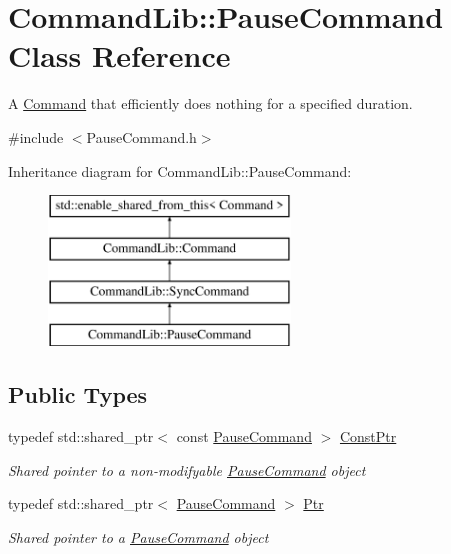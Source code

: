 \hypertarget{class_command_lib_1_1_pause_command}{}\section{Command\+Lib\+:\+:Pause\+Command Class Reference}
\label{class_command_lib_1_1_pause_command}


A \mbox{\hyperlink{class_command_lib_1_1_command}{Command}} that efficiently does nothing for a specified duration. 




{\ttfamily \#include $<$Pause\+Command.\+h$>$}

Inheritance diagram for Command\+Lib\+:\+:Pause\+Command\+:\begin{figure}[H]
\begin{center}
\leavevmode
\includegraphics[height=4.000000cm]{class_command_lib_1_1_pause_command}
\end{center}
\end{figure}
\subsection*{Public Types}
\begin{DoxyCompactItemize}
\item 
typedef std\+::shared\+\_\+ptr$<$ const \mbox{\hyperlink{class_command_lib_1_1_pause_command}{Pause\+Command}} $>$ \mbox{\hyperlink{class_command_lib_1_1_pause_command_ad14df8483794045a09d0b08007cbf289}{Const\+Ptr}}
\begin{DoxyCompactList}\small\item\em Shared pointer to a non-\/modifyable \mbox{\hyperlink{class_command_lib_1_1_pause_command}{Pause\+Command}} object\end{DoxyCompactList}\item 
typedef std\+::shared\+\_\+ptr$<$ \mbox{\hyperlink{class_command_lib_1_1_pause_command}{Pause\+Command}} $>$ \mbox{\hyperlink{class_command_lib_1_1_pause_command_ac4c00381b2c560c5d072a0eedaefa92b}{Ptr}}
\begin{DoxyCompactList}\small\item\em Shared pointer to a \mbox{\hyperlink{class_command_lib_1_1_pause_command}{Pause\+Command}} object\end{DoxyCompactList}\end{DoxyCompactItemize}
